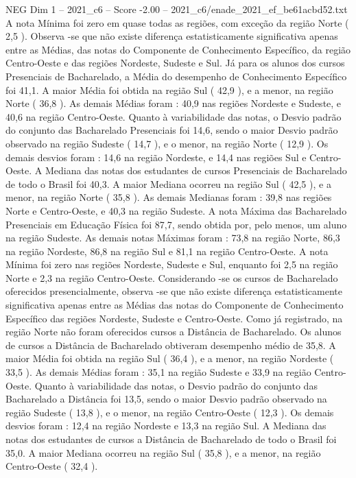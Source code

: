 \begin{textsample}{NEG Dim 1 – 2021\_c6 – Score -2.00 – 2021\_c6/enade\_2021\_ef\_be61acbd52.txt}
A nota Mínima foi zero em quase todas as regiões, com exceção da região Norte ( 2,5 ).
Observa -se que não existe diferença estatisticamente significativa apenas entre as Médias, das notas do Componente de Conhecimento Específico, da região Centro-Oeste e das regiões Nordeste, Sudeste e Sul.
Já para os alunos dos cursos Presenciais de Bacharelado, a Média do desempenho de Conhecimento Específico foi 41,1.
A maior Média foi obtida na região Sul ( 42,9 ), e a menor, na região Norte ( 36,8 ).
As demais Médias foram : 40,9 nas regiões Nordeste e Sudeste, e 40,6 na região Centro-Oeste.
Quanto à variabilidade das notas, o Desvio padrão do conjunto das Bacharelado Presenciais foi 14,6, sendo o maior Desvio padrão observado na região Sudeste ( 14,7 ), e o menor, na região Norte ( 12,9 ).
Os demais desvios foram : 14,6 na região Nordeste, e 14,4 nas regiões Sul e Centro-Oeste.
A Mediana das notas dos estudantes de cursos Presenciais de Bacharelado de todo o Brasil foi 40,3.
A maior Mediana ocorreu na região Sul ( 42,5 ), e a menor, na região Norte ( 35,8 ).
As demais Medianas foram : 39,8 nas regiões Norte e Centro-Oeste, e 40,3 na região Sudeste.
A nota Máxima das Bacharelado Presenciais em Educação Física foi 87,7, sendo obtida por, pelo menos, um aluno na região Sudeste.
As demais notas Máximas foram : 73,8 na região Norte, 86,3 na região Nordeste, 86,8 na região Sul e 81,1 na região Centro-Oeste.
A nota Mínima foi zero nas regiões Nordeste, Sudeste e Sul, enquanto foi 2,5 na região Norte e 2,3 na região Centro-Oeste.
Considerando -se os cursos de Bacharelado oferecidos presencialmente, observa -se que não existe diferença estatisticamente significativa apenas entre as Médias das notas do Componente de Conhecimento Específico das regiões Nordeste, Sudeste e Centro-Oeste.
Como já registrado, na região Norte não foram oferecidos cursos a Distância de Bacharelado.
Os alunos de cursos a Distância de Bacharelado obtiveram desempenho médio de 35,8.
A maior Média foi obtida na região Sul ( 36,4 ), e a menor, na região Nordeste ( 33,5 ).
As demais Médias foram : 35,1 na região Sudeste e 33,9 na região Centro-Oeste.
Quanto à variabilidade das notas, o Desvio padrão do conjunto das Bacharelado a Distância foi 13,5, sendo o maior Desvio padrão observado na região Sudeste ( 13,8 ), e o menor, na região Centro-Oeste ( 12,3 ).
Os demais desvios foram : 12,4 na região Nordeste e 13,3 na região Sul.
A Mediana das notas dos estudantes de cursos a Distância de Bacharelado de todo o Brasil foi 35,0.
A maior Mediana ocorreu na região Sul ( 35,8 ), e a menor, na região Centro-Oeste ( 32,4 ).

\end{textsample}
